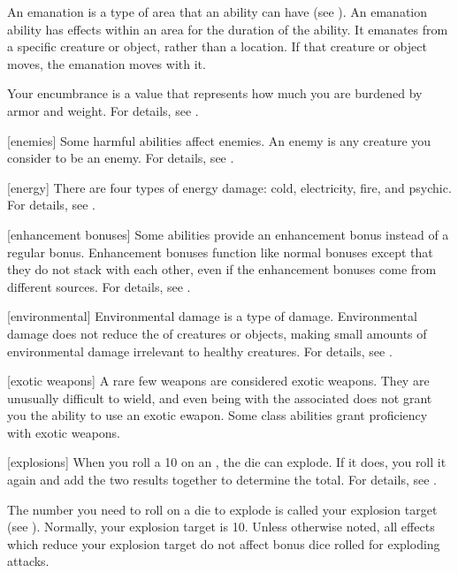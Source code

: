  An emanation is a type of area that an ability can have (see ).
An emanation ability has effects within an area for the duration of the ability.
It emanates from a specific creature or object, rather than a location.
If that creature or object moves, the emanation moves with it.

 Your encumbrance is a value that represents how much you are burdened by armor and weight.
For details, see .

[enemies] Some harmful abilities affect enemies.
An enemy is any creature you consider to be an enemy.
For details, see .

[energy] There are four types of energy damage: cold, electricity, fire, and psychic.
For details, see .

[enhancement bonuses] Some abilities provide an enhancement bonus instead of a regular bonus.
Enhancement bonuses function like normal bonuses except that they do not stack with each other, even if the enhancement bonuses come from different sources.
For details, see .

[environmental] Environmental damage is a type of damage.
Environmental damage does not reduce the  of creatures or objects, making small amounts of environmental damage irrelevant to healthy creatures.
For details, see .

[exotic weapons] A rare few weapons are considered exotic weapons.
They are unusually difficult to wield, and even being  with the associated  does not grant you the ability to use an exotic ewapon.
Some class abilities grant proficiency with exotic weapons.

[explosions] When you roll a 10 on an , the die can explode.
If it does, you roll it again and add the two results together to determine the total.
For details, see .

 The number you need to roll on a die to explode is called your explosion target (see ).
Normally, your explosion target is 10.
Unless otherwise noted, all effects which reduce your explosion target do not affect bonus dice rolled for exploding attacks.

